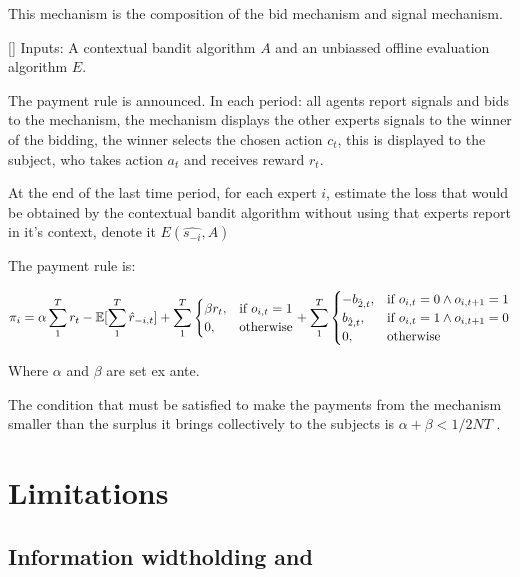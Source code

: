 This mechanism is the composition of the bid mechanism and signal mechanism.


\begin{mech}\label{mech:bidbandit}[]
Inputs: A contextual bandit algorithm $A$ and an unbiassed offline evaluation algorithm $E$.



The payment rule is announced.
 In each period: all agents report signals and bids to the mechanism, the mechanism displays the other experts signals to the winner of the bidding, the winner selects the chosen action $c_t$, this is displayed to the subject, who takes action $a_t$ and receives reward $r_t$.

At the end of the last time period, for each expert $i$, estimate the loss that would be obtained by the contextual bandit algorithm without using that experts report in it's context, denote it $E(\hat{s_{-i}},A)$



The payment rule is:

\[
    \pi_i = 
\alpha \sum_1^T r_t -  \expec[\sum_1^T \hat{r}_{-i,t}]
+
\sum_1^T
\begin{cases}
    \beta r_t ,& \text{if } o_{i,t} = 1\\
     0,              & \text{otherwise}
\end{cases}
+
\sum_1^T
\begin{cases}
     - b_{\hat{2},t} ,& \text{if } o_{i,t} = 0 \land o_{i,t+1} = 1\\
       b_{\hat{2},t} ,& \text{if } o_{i,t} = 1 \land o_{i,t+1} = 0 \\
	   0,              & \text{otherwise}
\end{cases}
\]

Where $\alpha$ and $\beta$ are set ex ante. 
\end{mech}


The condition that must be satisfied to make the payments from the mechanism smaller than the surplus it brings collectively to the subjects is $ \alpha + \beta < 1/2NT$ .


\section{Limitations}

\subsection{Information widtholding and}

